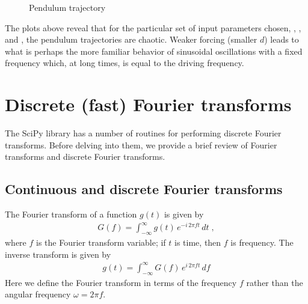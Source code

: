 \documentclass[letterpaper,10pt,english]{sphinxmanual}
\begin{document}
\begin{figure}[htbp]
\centering
\capstart

\noindent{}
\caption{Pendulum trajectory}\label{\detokenize{chap9/chap9_scipy:id2}}\label{\detokenize{chap9/chap9_scipy:fig-odepend}}\end{figure}

\sphinxAtStartPar
The plots above reveal that for the particular set of input parameters chosen, , , and , the pendulum trajectories are chaotic.  Weaker forcing (smaller \(d\)) leads to what is perhaps the more familiar behavior of sinusoidal oscillations with a fixed frequency which, at long times, is equal to the driving frequency.

\ignorespaces 

\section{Discrete (fast) Fourier transforms}
\label{\detokenize{chap9/chap9_scipy:discrete-fast-fourier-transforms}}\label{\detokenize{chap9/chap9_scipy:index-5}}
\sphinxAtStartPar
The SciPy library has a number of routines for performing discrete Fourier transforms.  Before delving into them, we provide a brief review of Fourier transforms and discrete Fourier transforms.


\subsection{Continuous and discrete Fourier transforms}
\label{\detokenize{chap9/chap9_scipy:continuous-and-discrete-fourier-transforms}}
\sphinxAtStartPar
The Fourier transform of a function \(g(t)\) is given by
\begin{equation}\label{equation:chap9/chap9_scipy:eq:FT}
\begin{split} G(f) = \int_{-\infty}^\infty g(t)\, e^{-i\, 2\pi f t}\, dt \;,\end{split}
\end{equation}
\sphinxAtStartPar
where \(f\) is the Fourier transform variable; if \(t\) is time, then \(f\) is frequency.  The inverse transform is given by
\begin{equation}\label{equation:chap9/chap9_scipy:eq:iFT}
\begin{split} g(t) = \int_{-\infty}^\infty G(f)\, e^{i\, 2\pi ft}\, df\end{split}
\end{equation}
\sphinxAtStartPar
Here we define the Fourier transform in terms of the frequency \(f\) rather than the angular frequency \(\omega = 2\pi f\).
\end{document}
